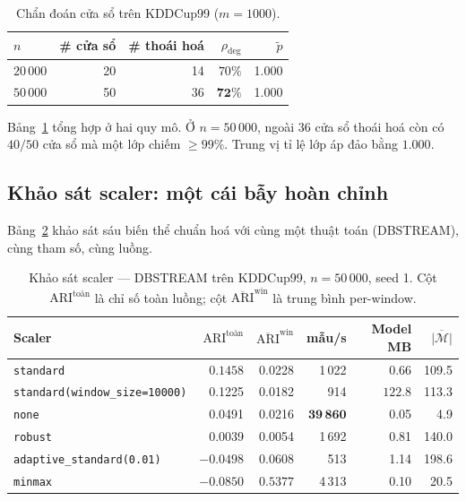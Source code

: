 \documentclass[11pt,a4paper]{article}
\theoremstyle{remark}
\begin{document}
\begin{table}[htbp]
\centering
\small
\caption{Chẩn đoán cửa sổ trên KDDCup99 ($m=1000$).}
\label{tab:diag}
\begin{tabular}{@{}lrrrr@{}}
\toprule
$n$ & \# cửa sổ & \# thoái hoá & $\rho_{\text{deg}}$ & $\tilde p$ \\
\midrule
$20\,000$ & 20 & 14 & $70\%$ & 1.000 \\
$50\,000$ & 50 & 36 & $\mathbf{72\%}$ & 1.000 \\
\bottomrule
\end{tabular}
\end{table}

Bảng~\ref{tab:diag} tổng hợp ở hai quy mô.
Ở $n=50\,000$, ngoài $36$ cửa sổ thoái hoá còn có $40/50$ cửa sổ mà một lớp
chiếm $\ge 99\%$. Trung vị tỉ lệ lớp áp đảo bằng $1.000$.

\subsection{Khảo sát scaler: một cái bẫy hoàn chỉnh}
\label{sec:ablation}

Bảng~\ref{tab:ablation} khảo sát sáu biến thể chuẩn hoá với cùng một thuật toán
(DBSTREAM), cùng tham số, cùng luồng.

\begin{table}[htbp]
\centering
\small
\caption{Khảo sát scaler --- DBSTREAM trên KDDCup99, $n=50\,000$, seed 1.
Cột $\mathrm{ARI}^{\text{toàn}}$ là chỉ số toàn luồng; cột
$\overline{\mathrm{ARI}}^{\text{win}}$ là trung bình per-window.}
\label{tab:ablation}
\begin{tabular}{@{}lrrrrr@{}}
\toprule
\textbf{Scaler} & $\mathrm{ARI}^{\text{toàn}}$ & $\overline{\mathrm{ARI}}^{\text{win}}$
 & \textbf{mẫu/s} & \textbf{Model MB} & $\overline{|\mathcal{M}|}$ \\
\midrule
\texttt{standard}                       & $\mathbf{0.1458}$ & 0.0228 & 1\,022 & 0.66 & 109.5 \\
\texttt{standard(window\_size=10000)}   & 0.1225 & 0.0182 & 914 & $\mathbf{122.8}$ & 113.3 \\
\texttt{none}                           & 0.0491 & 0.0216 & $\mathbf{39\,860}$ & 0.05 & 4.9 \\
\texttt{robust}                         & 0.0039 & 0.0054 & 1\,692 & 0.81 & 140.0 \\
\texttt{adaptive\_standard(0.01)}       & $-0.0498$ & 0.0608 & 513 & 1.14 & 198.6 \\
\texttt{minmax}                         & $\mathbf{-0.0850}$ & $\mathbf{0.5377}$ & 4\,313 & 0.10 & 20.5 \\
\bottomrule
\end{tabular}
\end{table}
\end{document}
